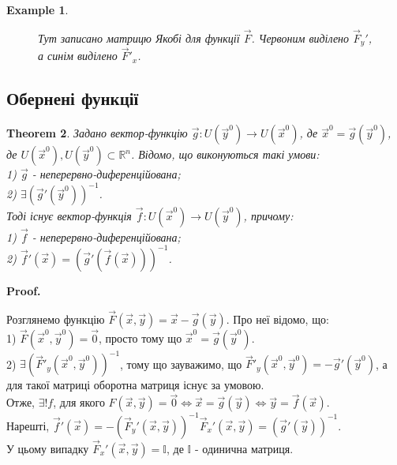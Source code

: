 \documentclass[a4paper, 10pt]{article}
\makeatletter
\def\departial#1#2{\dfrac{\partial {#1}}{\partial {#2}}}
\def\qed{$\blacksquare$}
\theoremstyle{theoremdd}
\newtheorem{theorem}{Theorem}[subsection]
\theoremstyle{theoremdd}
\theoremstyle{theoremdd}
\theoremstyle{theoremdd}
\theoremstyle{theoremdd}
\newtheorem{example}[theorem]{Example}
\theoremstyle{theoremdd}
\theoremstyle{theoremdd}
\theoremstyle{theoremdd}
\theoremstyle{theoremdd}
\renewenvironment{proof}[1][Proof.\\]{\par
\pushQED{\hfill \qed}%
\normalfont \topsep6\p@\@plus6\p@\relax
\trivlist
\item\relax
{\bfseries
#1\@addpunct{.}}\hspace\labelsep\ignorespaces
}{%
\popQED\endtrivlist\@endpefalse
}
\makeatother
\begin{document}
\begin{example}
\begin{figure}[H]
\centering
{}
\caption*{Тут записано матрицю Якобі для функції $\vec{F}$. Червоним виділено $\vec{F}_y'$, а синім виділено $\vec{F}'_x$.}
\end{figure}
\end{example}

\subsection{Обернені функції}
\begin{theorem}
Задано вектор-функцію $\vec{g}: U(\vec{y}^0) \to U(\vec{x}^0)$, де $\vec{x}^0 = \vec{g}(\vec{y}^0)$, де $U(\vec{x}^0), U(\vec{y}^0) \subset \mathbb{R}^n$. Відомо, що виконуються такі умови:\\
1) $\vec{g}$ - неперервно-диференційована; \\
2) $\exists (\vec{g}'(\vec{y}^0))^{-1}$.\\
Тоді існує вектор-функція $\vec{f}: U(\vec{x}^0) \to U(\vec{y}^0)$, причому:\\
1) $\vec{f}$ - неперервно-диференційована; \\
2) $\vec{f}'(\vec{x}) = (\vec{g}'(\vec{f}(\vec{x})))^{-1}$.

\end{theorem}

\begin{proof}
Розглянемо функцію $\vec{F}(\vec{x},\vec{y}) = \vec{x} - \vec{g}(\vec{y})$. Про неї відомо, що:\\
1) $\vec{F}(\vec{x}^0,\vec{y}^0) = \vec{0}$, просто тому що $\vec{x}^0 = \vec{g}(\vec{y}^0)$.\\
2) $\exists (\vec{F}'_y(\vec{x}^0,\vec{y}^0))^{-1}$, тому що зауважимо, що $\vec{F}'_y(\vec{x}^0,\vec{y}^0) = -\vec{g}'(\vec{y}^0)$, а для такої матриці оборотна матриця існує за умовою.\\
Отже, $\exists! f$, для якого $F(\vec{x},\vec{y}) = \vec{0} \iff \vec{x} = \vec{g}(\vec{y}) \iff \vec{y} = \vec{f}(\vec{x})$.\\
Нарешті, $\vec{f}'(\vec{x}) = -(\vec{F}_y'(\vec{x},\vec{y}))^{-1} \vec{F}_x'(\vec{x},\vec{y}) = (\vec{g}'(\vec{y}))^{-1}$.\\
У цьому випадку $\vec{F}_x'(\vec{x},\vec{y}) = \mathbb{I}$, де $\mathbb{I}$ - одинична матриця.
\end{proof}
\end{document}
